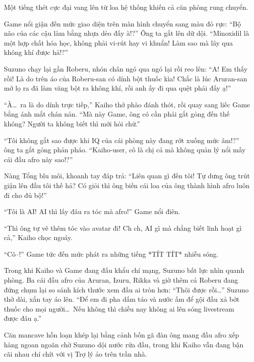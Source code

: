 \documentclass[../main.tex]{subfiles}
\begin{document}
Một tiếng thét cực đại vang lên từ loa hệ thống khiến cả căn phòng rung chuyển.

Game nổi giận đến mức giao diện trên màn hình chuyển sang màu đỏ rực: ``Bộ não của các cậu làm bằng nhựa dẻo đấy à!?'' Ông ta gắt lên dữ dội. ``Minoxidil là một hợp chất hóa học, không phải vi-rút hay vi khuẩn! Làm sao mà lây qua không khí được hả!?''

Suzuno chạy lại gần Roberu, nhón chân ngó qua ngó lại rồi reo lên: ``A! Em thấy rồi! Là do trên áo của Roberu-san có dính bột thuốc kìa! Chắc là lúc Aruran-san mở lọ ra đã làm văng bột ra không khí, rồi anh ấy đi qua quệt phải đấy ạ!''

``À\dots\ ra là do dính trực tiếp,'' Kaiho thở phào đánh thót, rồi quay sang liếc Game bằng ánh mắt chán nản. ``Mà này Game, ông có cần phải gắt gỏng đến thế không? Người ta không biết thì mới hỏi chứ.''

``Tôi không gắt sao được khi IQ của cái phòng này đang rớt xuống mức âm!?'' ông ta gắt gỏng phản pháo. ``Kaiho-user, cô là chị cả mà không quản lý nổi mấy cái đầu afro này sao!?''

Nàng Tổng bĩu môi, khoanh tay đáp trả: ``Liên quan gì đến tôi! Tự dưng ông trút giận lên đầu tôi thế hả? Có giỏi thì ông biến cái loa của ông thành hình afro luôn đi cho đủ bộ!''

``Tôi là AI! AI thì lấy đâu ra tóc mà afro!'' Game nổi điên.

``Thì ông tự vẽ thêm tóc vào avatar đi! Ch ch, AI gì mà chẳng biết linh hoạt gì cả,'' Kaiho chọc ngoáy.

``Cô--!'' Game tức đến mức phát ra những tiếng *TÍT TÍT* nhiễu sóng.

Trong khi Kaiho và Game đang đấu khẩu chí mạng, Suzuno bất lực nhìn quanh phòng. Ba cái đầu afro của Aruran, Izuru, Rikka và giờ thêm cả Roberu đang đứng chụm lại so sánh kích thước xem đầu ai tròn hơn: ``Thôi được rồi\dots'' Suzuno thở dài, xắn tay áo lên. ``Để em đi pha dấm táo và nước ấm để gội đầu xả bớt thuốc cho mọi người\dots\ Nếu không thì chiều nay không ai lên sóng livestream được đâu ạ.''

Căn mancave hỗn loạn khép lại bằng cảnh bốn gã đàn ông mang đầu afro xếp hàng ngoan ngoãn chờ Suzuno dội nước rửa đầu, trong khi Kaiho vẫn đang bận cãi nhau chí chít với vị Trợ lý ảo trên trần nhà.

\newpage
\omk

\vspace{-30pt}
\end{document}
